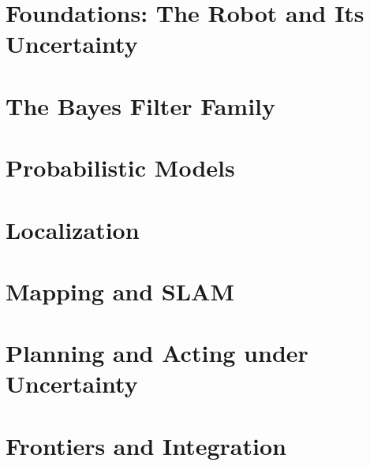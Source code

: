 \documentclass[11pt, twoside, openright]{book}
\begin{document}
\mainmatter

\part{Foundations: The Robot and Its Uncertainty}





\part{The Bayes Filter Family}





\part{Probabilistic Models}



\part{Localization}



\part{Mapping and SLAM}








\part{Planning and Acting under Uncertainty}






\part{Frontiers and Integration}


\end{document}
